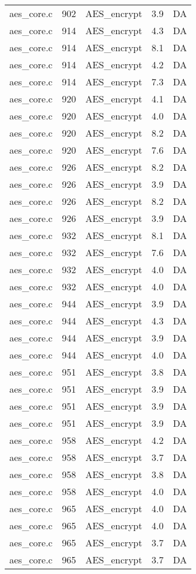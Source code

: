\begin{table}[h!]
\begin{tabular}{lrlrr}
aes\_core.c& 902&AES\_encrypt&3.9 &DA\\
aes\_core.c& 914&AES\_encrypt&4.3 &DA\\
aes\_core.c& 914&AES\_encrypt&8.1 &DA\\
aes\_core.c& 914&AES\_encrypt&4.2 &DA\\
aes\_core.c& 914&AES\_encrypt&7.3 &DA\\
aes\_core.c& 920&AES\_encrypt&4.1 &DA\\
aes\_core.c& 920&AES\_encrypt&4.0 &DA\\
aes\_core.c& 920&AES\_encrypt&8.2 &DA\\
aes\_core.c& 920&AES\_encrypt&7.6 &DA\\
aes\_core.c& 926&AES\_encrypt&8.2 &DA\\
aes\_core.c& 926&AES\_encrypt&3.9 &DA\\
aes\_core.c& 926&AES\_encrypt&8.2 &DA\\
aes\_core.c& 926&AES\_encrypt&3.9 &DA\\
aes\_core.c& 932&AES\_encrypt&8.1 &DA\\
aes\_core.c& 932&AES\_encrypt&7.6 &DA\\
aes\_core.c& 932&AES\_encrypt&4.0 &DA\\
aes\_core.c& 932&AES\_encrypt&4.0 &DA\\
aes\_core.c& 944&AES\_encrypt&3.9 &DA\\
aes\_core.c& 944&AES\_encrypt&4.3 &DA\\
aes\_core.c& 944&AES\_encrypt&3.9 &DA\\
aes\_core.c& 944&AES\_encrypt&4.0 &DA\\
aes\_core.c& 951&AES\_encrypt&3.8 &DA\\
aes\_core.c& 951&AES\_encrypt&3.9 &DA\\
aes\_core.c& 951&AES\_encrypt&3.9 &DA\\
aes\_core.c& 951&AES\_encrypt&3.9 &DA\\
aes\_core.c& 958&AES\_encrypt&4.2 &DA\\
aes\_core.c& 958&AES\_encrypt&3.7 &DA\\
aes\_core.c& 958&AES\_encrypt&3.8 &DA\\
aes\_core.c& 958&AES\_encrypt&4.0 &DA\\
aes\_core.c& 965&AES\_encrypt&4.0 &DA\\
aes\_core.c& 965&AES\_encrypt&4.0 &DA\\
aes\_core.c& 965&AES\_encrypt&3.7 &DA\\
aes\_core.c& 965&AES\_encrypt&3.7 &DA\\
\hline
\end{tabular}
\renewcommand{\baselinestretch}{1.0}\selectfont
\end{table}
